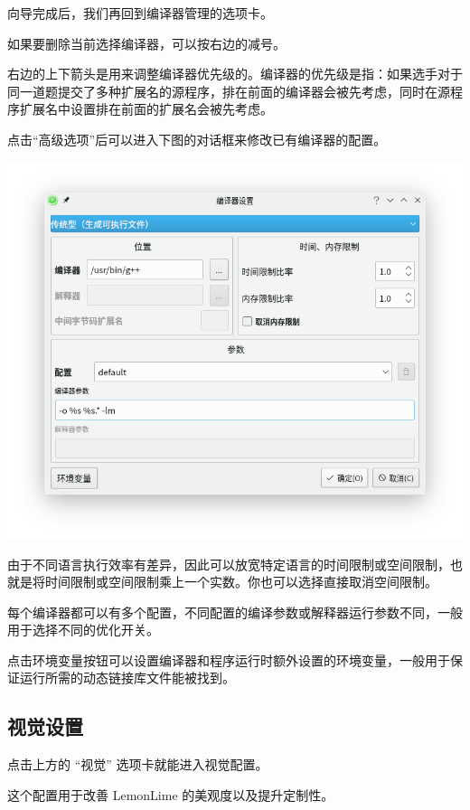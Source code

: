 \documentclass[UTF-8]{ctexart}
\begin{document}
				向导完成后，我们再回到编译器管理的选项卡。
				
				如果要删除当前选择编译器，可以按右边的减号。
				
				右边的上下箭头是用来调整编译器优先级的。编译器的优先级是指：如果选手对于同一道题提交了多种扩展名的源程序，排在前面的编译器会被先考虑，同时在源程序扩展名中设置排在前面的扩展名会被先考虑。
				
				点击“高级选项”后可以进入下图的对话框来修改已有编译器的配置。
				
				\begin{center}
				\includegraphics[scale=0.7]{pics/compilersettings2.png}
				\end{center}
				
				由于不同语言执行效率有差异，因此可以放宽特定语言的时间限制或空间限制，也就是将时间限制或空间限制乘上一个实数。你也可以选择直接取消空间限制。
				
				每个编译器都可以有多个配置，不同配置的编译参数或解释器运行参数不同，一般用于选择不同的优化开关。
				
				点击环境变量按钮可以设置编译器和程序运行时额外设置的环境变量，一般用于保证运行所需的动态链接库文件能被找到。
				
				
			\subsection{视觉设置}
				
				点击上方的 “视觉” 选项卡就能进入视觉配置。
				
				这个配置用于改善 LemonLime 的美观度以及提升定制性。
				
\end{document}

